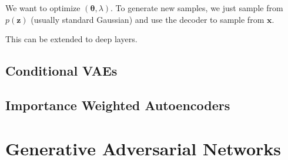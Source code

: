\documentclass{article}
\theoremstyle{definition}
\theoremstyle{remark}
\theoremstyle{definition}
\begin{document}
    We want to optimize $(\boldsymbol{\theta}, \lambda)$. To generate new samples, we just sample from $p(\mathbf{z})$ (usually standard Gaussian) and use the decoder to sample from $\mathbf{x}$.  

    This can be extended to deep layers. 

  \subsection{Conditional VAEs}

  \subsection{Importance Weighted Autoencoders}

\section{Generative Adversarial Networks}
\end{document}
